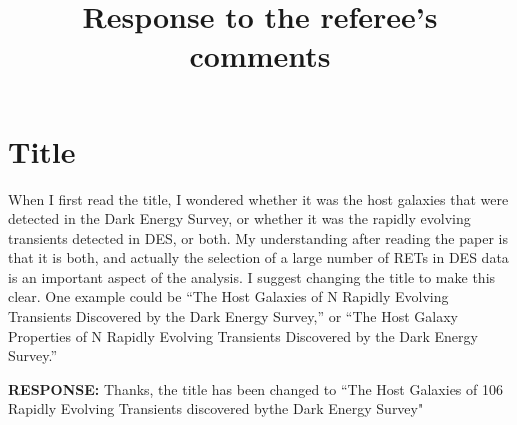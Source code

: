 \documentclass{article}
\begin{document}
\title{Response to the referee's comments}
\date{}
\maketitle
\section*{Title}
When I first read the title, I wondered whether it was the host galaxies that were detected in the Dark Energy Survey, or whether it was the rapidly evolving transients detected in DES, or both. My understanding after reading the paper is that it is both, and actually the selection of a large number of RETs in DES data is an important aspect of the analysis. I suggest changing the title to make this clear. One example could be “The Host Galaxies of N Rapidly Evolving Transients Discovered by the Dark Energy Survey,” or “The Host Galaxy Properties of N Rapidly Evolving Transients Discovered by the Dark Energy Survey.”

\vskip0.1cm
{\bf RESPONSE: } Thanks, the title has been changed to ``The Host Galaxies of 106 Rapidly Evolving Transients discovered bythe Dark Energy Survey"
\end{document}
